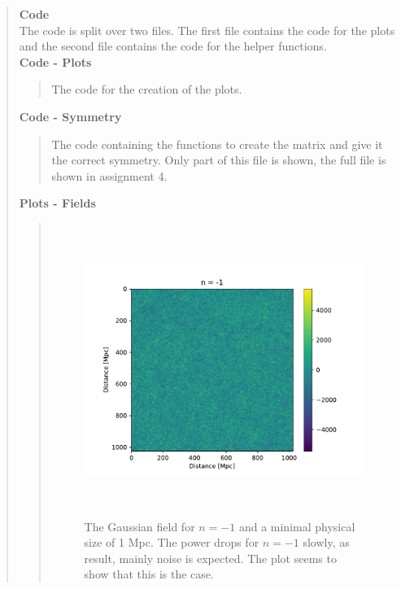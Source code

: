 \begin{quote}
\begin{quote}
\end{quote}
\newpage
\textbf{Code} \\
The code is split over two files. The first file contains the code for the plots and the second file contains the code for the helper functions. \\

\textbf{Code - Plots}
\begin{quote}
The code for the creation of the plots.


\end{quote}

\textbf{Code - Symmetry}
\begin{quote}
The code containing the functions to create the matrix and give it the correct
symmetry. Only part of this file is shown, the full file is shown in assignment 4.

\end{quote}
\newpage

\textbf{Plots - Fields}
\begin{quote}

\begin{figure}[!ht]
\centering
\includegraphics[width=14cm, height=9.5cm]{./Plots/2_field_-1.pdf}
\caption{The Gaussian field for $n = -1$ and a minimal physical size of 1 Mpc. The power drops for  $n = -1$ slowly, as result, mainly noise is expected. The plot seems to show that this is the case.}
\end{figure}


\end{quote}
\end{quote}
